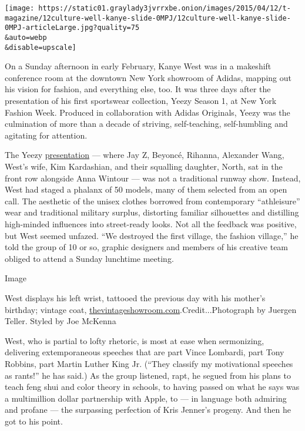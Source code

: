 \texttt{[image: https://static01.graylady3jvrrxbe.onion/images/2015/04/12/t-magazine/12culture-well-kanye-slide-0MPJ/12culture-well-kanye-slide-0MPJ-articleLarge.jpg?quality=75\\\&auto=webp\\\&disable=upscale]}

On a Sunday afternoon in early February, Kanye West was in a makeshift
conference room at the downtown New York showroom of Adidas, mapping out
his vision for fashion, and everything else, too. It was three days
after the presentation of his first sportswear collection, Yeezy Season
1, at New York Fashion Week. Produced in collaboration with Adidas
Originals, Yeezy was the culmination of more than a decade of striving,
self-teaching, self-humbling and agitating for attention.

The Yeezy
\href{http://tmagazine.blogs.nytimes3xbfgragh.onion/2015/02/20/fall-winter-2015-new-york-fashion-week-top-ten/}{presentation}
--- where Jay Z, Beyoncé, Rihanna, Alexander Wang, West's wife, Kim
Kardashian, and their squalling daughter, North, sat in the front row
alongside Anna Wintour --- was not a traditional runway show. Instead,
West had staged a phalanx of 50 models, many of them selected from an
open call. The aesthetic of the unisex clothes borrowed from
contemporary ``athleisure'' wear and traditional military surplus,
distorting familiar silhouettes and distilling high-minded influences
into street-ready looks. Not all the feedback was positive, but West
seemed unfazed. ``We destroyed the first village, the fashion village,''
he told the group of 10 or so, graphic designers and members of his
creative team obliged to attend a Sunday lunchtime meeting.

Image

West displays his left wrist, tattooed the previous day with his
mother's birthday; vintage coat,
\href{http://www.thevintageshowroom.com}{thevintageshowroom.com}.Credit...Photograph
by Juergen Teller. Styled by Joe McKenna

West, who is partial to lofty rhetoric, is most at ease when
sermonizing, delivering extemporaneous speeches that are part Vince
Lombardi, part Tony Robbins, part Martin Luther King Jr. (``They
classify my motivational speeches as rants!'' he has said.) As the group
listened, rapt, he segued from his plans to teach feng shui and color
theory in schools, to having passed on what he says was a multimillion
dollar partnership with Apple, to --- in language both admiring and
profane --- the surpassing perfection of Kris Jenner's progeny. And then
he got to his point.

